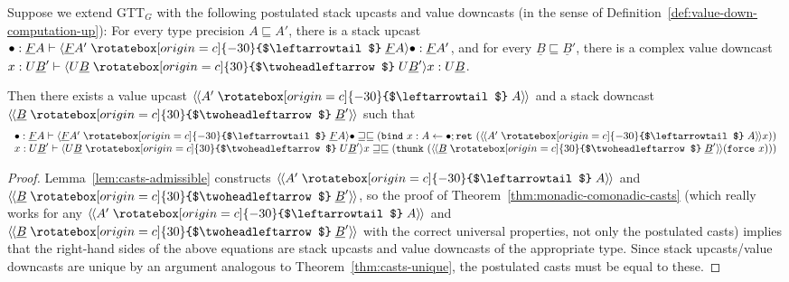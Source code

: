 \documentclass[acmsmall,screen,12pt]{acmart}
\renewcommand{\u}{\underline}
\newcommand{\ltdyn}{\sqsubseteq}
\newcommand{\gtdyn}{\sqsupseteq}
\newcommand{\equidyn}{\mathrel{\gtdyn\ltdyn}}
\newcommand{\uarrow}{\mathrel{\rotatebox[origin=c]{-30}{$\leftarrowtail$}}}
\newcommand{\darrow}{\mathrel{\rotatebox[origin=c]{30}{$\twoheadleftarrow$}}}
\newcommand{\upcast}[2]{\langle{#2}\uarrow{#1}\rangle}
\newcommand{\dncast}[2]{\langle{#1}\darrow{#2}\rangle}
\newcommand{\defupcast}[2]{\langle\kern-1ex~\langle{#2}\uarrow{#1}\rangle\kern-1ex~\rangle}
\newcommand{\defdncast}[2]{\langle\kern-1ex~\langle{#1}\darrow{#2}\rangle\kern-1ex~\rangle}
\newcommand{\bindXtoYinZ}[2]{\kw{bind}#2 \leftarrow #1;}
\newcommand{\kw}[1]{\texttt{#1}\,\,}
\newcommand{\ret}{\kw{ret}}
\newcommand{\thunk}{\kw{thunk}}
\newcommand{\force}{\kw{force}}
\begin{document}
\begin{theorem}
  \label{thm:upcasts-values-downcasts-stacks}
  Suppose we extend GTT$_G$ with the following postulated stack upcasts
  and value downcasts (in the sense of
  Definition~\ref{def:value-down-computation-up}): For every type
  precision $A \ltdyn A'$, there is a stack upcast $\bullet : \u F A
  \vdash \upcast{\u F A}{\u F A'}{\bullet} : \u F A'$, and for every $\u
  B \ltdyn \u B'$, there is a complex value downcast $x : U \u B' \vdash
  \dncast{U \u B}{U \u B'}{x} : U \u B$.

  Then there exists a value upcast $\defupcast{A}{A'}$ and a stack
  downcast $\defdncast{\u B}{\u B'}$ such that
  \[
  \begin{array}{c}
  \bullet : \u F A \vdash \upcast{\u F A}{\u F A'}{\bullet} \equidyn { (\bindXtoYinZ{{\bullet}}{x:A}{\ret{(\defupcast{A}{A'}{x})}})}\\
  x : U \u B' \vdash \dncast{U \u B}{U \u B'}{x} \equidyn {(\thunk{(\defdncast{\u B}{\u B'}{(\force x)})})}
  \end{array}
  \]
\end{theorem}

\begin{proof}
Lemma~\ref{lem:casts-admissible} constructs $\defupcast{A}{A'}$ and
$\defdncast{\u B}{\u B'}$, so the proof of
Theorem~\ref{thm:monadic-comonadic-casts} (which really works for any
$\defupcast{A}{A'}$ and $\defdncast{\u B}{\u B'}$ with the correct
universal properties, not only the postulated casts) implies that the
right-hand sides of the above equations are stack upcasts and value
downcasts of the appropriate type.  Since stack upcasts/value downcasts
are unique by an argument analogous to Theorem~\ref{thm:casts-unique},
the postulated casts must be equal to these.
\end{proof}
\end{document}
